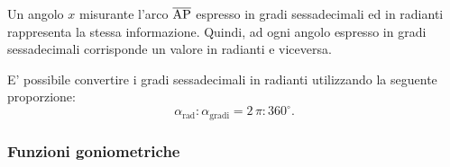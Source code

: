 \begin{remark}
    Un angolo $x$ misurante l'arco $\overline{\rm AP}$ espresso in gradi sessadecimali ed in radianti rappresenta la stessa informazione. Quindi, ad ogni angolo espresso in gradi sessadecimali corrisponde un valore in radianti e viceversa.
\end{remark}

\begin{property}
    E' possibile convertire i gradi sessadecimali in radianti utilizzando la seguente proporzione:
    \begin{equation*}
        \alpha_{\text{rad}}\colon\alpha_{\text{gradi}}=2\,\pi\colon 360^\circ.
    \end{equation*}
\end{property}

\subsubsection{Funzioni goniometriche}
